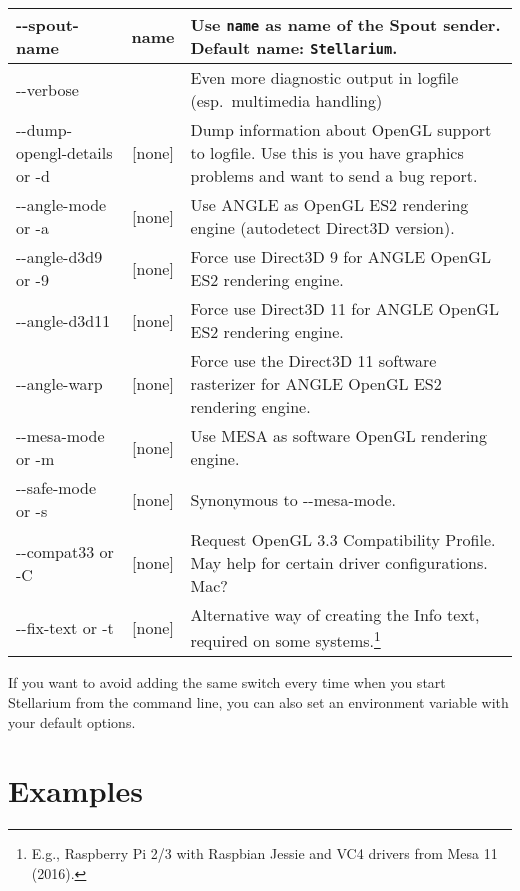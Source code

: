 \begin{longtable}{l|c|p{68mm}}
-\/-spout-name       & name       & Use \texttt{name} as name of the Spout sender. Default name: \texttt{Stellarium}.\footnotemark[1]\\\midrule									
-\/-verbose          &            & Even more diagnostic output in logfile (esp.\ multimedia handling)\\
-\/-dump-opengl-details or -d     & {[}none{]} & Dump information about OpenGL support to logfile. 
                                                 Use this is you have graphics problems and want to send a bug report. \\\midrule
-\/-angle-mode or -a & {[}none{]} & Use ANGLE as OpenGL ES2 rendering engine (autodetect Direct3D version).\footnotemark[1]\\
-\/-angle-d3d9 or -9 & {[}none{]} & Force use Direct3D 9 for ANGLE OpenGL ES2 rendering engine.\footnotemark[1]\\
-\/-angle-d3d11      & {[}none{]} & Force use Direct3D 11 for ANGLE OpenGL ES2 rendering engine.\footnotemark[1]\\
-\/-angle-warp       & {[}none{]} & Force use the Direct3D 11 software rasterizer for ANGLE OpenGL ES2 rendering engine.\footnotemark[1]\\
-\/-mesa-mode or -m  & {[}none{]} & Use MESA as software OpenGL rendering engine.\footnotemark[1]\\
-\/-safe-mode or -s  & {[}none{]} & Synonymous to -\/-mesa-mode.\footnotemark[1]\\
-\/-compat33 or -C   & {[}none{]} & Request OpenGL 3.3 Compatibility Profile. May help for certain driver configurations. Mac?\\
-\/-fix-text or -t   & {[}none{]} & Alternative way of creating the Info text, required on some systems.\footnote{E.g., Raspberry Pi 2/3 with Raspbian Jessie and VC4 drivers from Mesa 11 (2016).}\\\bottomrule
\end{longtable}

\noindent {} If you want to avoid adding the same
switch every time when you start Stellarium from the command line, you
can also set an environment variable  with your
default options. 

\section{Examples}
\label{sec:CommandLineOptions:Examples}

